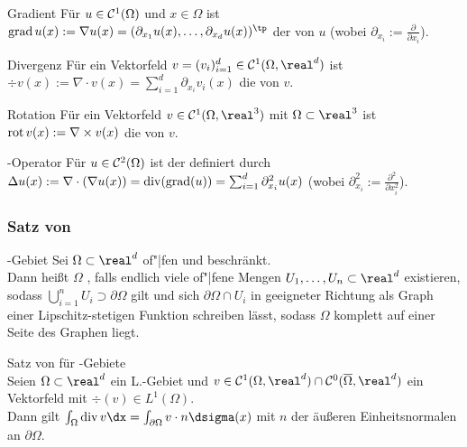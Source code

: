 \begin{Def}{Gradient}
    Für $u \in \mathcal{C}^1(\Omega)$ und $x \in \Omega$ ist
    $\grad u(x) := \nabla u(x) = (\partial_{x_1} u(x), \dotsc, \partial_{x_d} u(x))^\tp$
    der  von $u$ (wobei $\partial_{x_i} := \frac{\partial}{\partial x_i}$).
\end{Def}

\begin{Def}{Divergenz}
    Für ein Vektorfeld $v = (v_i)_{i=1}^d \in \C^1(\Omega, \real^d)$ ist\\
    $\div v(x) := \nabla \cdot v(x) = \sum_{i=1}^d \partial_{x_i} v_i(x)$
    die  von $v$.
\end{Def}

\begin{Def}{Rotation}
    Für ein Vektorfeld $v \in \C^1(\Omega, \real^3)$ mit $\Omega \subset \real^3$ ist\\
    $\operatorname{rot} v(x) := \nabla \times v(x)$ die  von $v$.
\end{Def}

\begin{Def}{-Operator}
    Für $u \in \mathcal{C}^2(\Omega)$ ist der  definiert durch\\
    $\Delta u(x) := \nabla \cdot (\nabla u(x)) = \operatorname{div}(\operatorname{grad}(u)) =
    \sum_{i=1}^d \partial_{x_i}^2 u(x)$
    (wobei $\partial_{x_i}^2 := \frac{\partial^2}{\partial x_i^2}$).
\end{Def}

\subsubsection{%
    Satz von %
}

\begin{Def}{-Gebiet}
    Sei $\Omega \subset \real^d$ of"|fen und beschränkt.\\
    Dann heißt $\Omega$ , falls endlich viele
    of"|fene Mengen $U_1, \dotsc, U_n \subset \real^d$ existieren, sodass
    $\bigcup_{i=1}^n U_i \supset \partial\Omega$ gilt und
    sich $\partial\Omega \cap U_i$ in geeigneter Richtung als Graph einer Lipschitz-stetigen
    Funktion schreiben lässt, sodass $\Omega$ komplett auf einer Seite des Graphen liegt.
\end{Def}

\begin{Satz}{Satz von  für -Gebiete}\\
    Seien $\Omega \subset \real^d$ ein L.-Gebiet und
    $v \in \C^1(\Omega, \real^d) \cap \C^0(\overline{\Omega}, \real^d)$ ein Vektorfeld mit
    $\div(v) \in L^1(\Omega)$.\\
    Dann gilt $\int_\Omega \div v \dx = \int_{\partial\Omega} v \cdot n \dsigma(x)$ mit
    $n$ der äußeren Einheitsnormalen an $\partial\Omega$.
\end{Satz}

